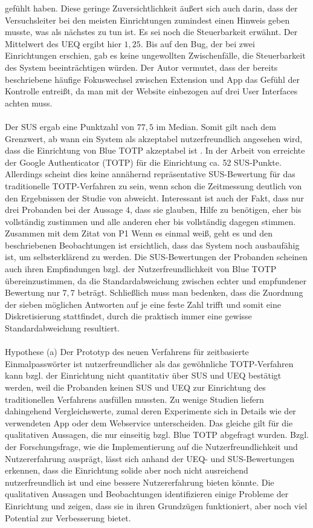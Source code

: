 gefühlt haben. Diese geringe Zuversichtlichkeit äußert sich auch 
darin, dass der Versuchsleiter bei den meisten Einrichtungen 
zumindest einen Hinweis geben musste, was als nächstes zu tun ist. 
Es sei noch die Steuerbarkeit erwähnt. Der Mittelwert des UEQ 
ergibt hier $1{,}25$. Bis auf den Bug, der bei zwei Einrichtungen 
erschien, gab es keine ungewollten Zwischenfälle, die 
Steuerbarkeit des System beeinträchtigen würden. Der Autor 
vermutet, dass der bereits beschriebene häufige Fokuswechsel 
zwischen Extension und App das Gefühl der Kontrolle entreißt, da 
man mit der Website einbezogen auf drei User Interfaces achten 
muss.
\\\\
Der SUS ergab eine Punktzahl von $77{,}5$ im Median. Somit gilt 
nach dem Grenzwert, ab wann ein System als akzeptabel 
nutzerfreundlich angesehen wird, dass die Einrichtung von Blue 
TOTP akzeptabel ist \autocite{BrookeRetro}. In der Arbeit von 
\textcite{Acemyan} erreichte der Google Authenticator (TOTP) für 
die Einrichtung ca. 52 SUS-Punkte. Allerdings scheint dies keine 
annähernd repräsentative SUS-Bewertung für das traditionelle 
TOTP-Verfahren zu sein, wenn schon die Zeitmessung deutlich von 
den Ergebnissen der Studie von \textcite{Reese} abweicht. 
Interessant ist auch der Fakt, dass nur drei Probanden bei der 
Aussage 4, dass sie glauben, Hilfe zu benötigen, eher bis 
vollständig zustimmen und alle anderen eher bis vollständig 
dagegen stimmen. Zusammen mit dem Zitat von P1 \glqq Wenn es 
einmal weiß, geht es\grqq{} und den beschriebenen Beobachtungen 
ist ersichtlich, dass das System noch ausbaufähig ist, um selbsterklärend zu werden. Die SUS-Bewertungen der Probanden scheinen 
auch ihren Empfindungen bzgl. der Nutzerfreundlichkeit von Blue 
TOTP übereinzustimmen, da die Standardabweichung zwischen echter 
und empfundener Bewertung nur $7{,}7$ beträgt. Schließlich muss 
man bedenken, dass die Zuordnung der sieben möglichen Antworten 
auf je eine feste Zahl trifft \autocite[121]{SUS11} und somit eine 
Diskretisierung stattfindet, durch die praktisch immer eine 
gewisse Standardabweichung resultiert.
\\\\
Hypothese (a) \glqq Der Prototyp des neuen Verfahrens für 
zeitbasierte Einmalpasswörter ist nutzerfreundlicher als das 
gewöhnliche TOTP-Verfahren\grqq{} kann bzgl. der Einrichtung nicht 
quantitativ über SUS und UEQ bestätigt werden, weil die Probanden 
keinen SUS und UEQ zur Einrichtung des traditionellen Verfahrens 
ausfüllen mussten. Zu wenige Studien liefern dahingehend 
Vergleichswerte, zumal deren Experimente sich in Details wie der 
verwendeten App oder dem Webservice unterscheiden. Das gleiche 
gilt für die qualitativen Aussagen, die nur einseitig bzgl. Blue 
TOTP abgefragt wurden. Bzgl. der Forschungsfrage, wie die 
Implementierung auf die Nutzerfreundlichkeit und Nutzererfahrung 
ausprägt, lässt sich anhand der UEQ- und SUS-Bewertungen erkennen, 
dass die Einrichtung solide aber noch nicht ausreichend 
nutzerfreundlich ist und eine bessere Nutzererfahrung bieten 
könnte. Die qualitativen Aussagen und Beobachtungen identifizieren 
einige Probleme der Einrichtung und zeigen, dass sie in ihren 
Grundzügen funktioniert, aber noch viel Potential zur Verbesserung 
bietet.